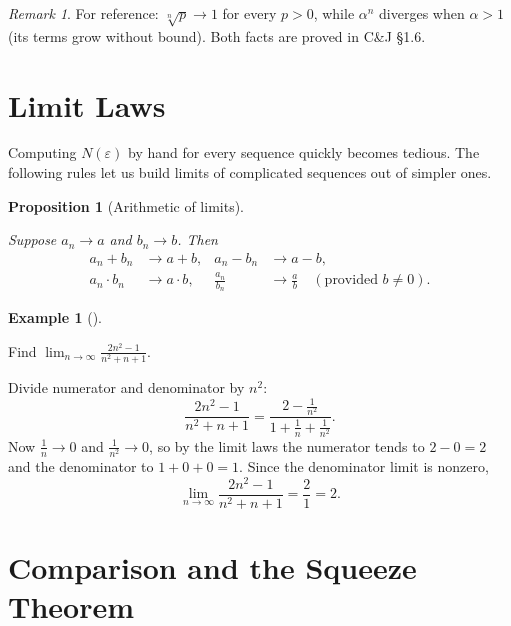 \documentclass[
  letterpaper,
  DIV=11,
  numbers=noendperiod]{scrreprt}
\theoremstyle{plain}
\theoremstyle{plain}
\newtheorem{proposition}{Proposition}[chapter]
\theoremstyle{definition}
\theoremstyle{definition}
\theoremstyle{definition}
\newtheorem{example}{Example}[chapter]
\theoremstyle{plain}
\theoremstyle{plain}
\theoremstyle{remark}
\newtheorem{refremark}{Remark}[chapter]
\begin{document}
\begin{refremark}
For reference: \(\sqrt[n]{p} \to 1\) for every \(p>0\), while
\(\alpha^n\) diverges when \(\alpha>1\) (its terms grow without bound).
Both facts are proved in C\&J §1.6.

\label{rem-sequences-limits-answers}

\end{refremark}

\section{Limit Laws}\label{limit-laws}

Computing \(N(\varepsilon)\) by hand for every sequence quickly becomes
tedious. The following rules let us build limits of complicated
sequences out of simpler ones.

\begin{proposition}[Arithmetic of
limits]\protect\hypertarget{prp-limit-laws}{}\label{prp-limit-laws}

Suppose \(a_n \to a\) and \(b_n \to b\). Then \[
\begin{aligned}
a_n + b_n &\to a + b, & a_n - b_n &\to a - b, \\
a_n \cdot b_n &\to a \cdot b, & \frac{a_n}{b_n} &\to \frac{a}{b} \quad (\text{provided } b \neq 0).
\end{aligned}
\]

\end{proposition}

\begin{example}[]\protect\hypertarget{exm-rational-sequence}{}\label{exm-rational-sequence}

\hfill\break
Find \(\displaystyle\lim_{n\to\infty} \frac{2n^2 - 1}{n^2 + n + 1}\).

Divide numerator and denominator by \(n^2\): \[
\frac{2n^2 - 1}{n^2 + n + 1}
= \frac{2 - \tfrac{1}{n^2}}{1 + \tfrac1n + \tfrac{1}{n^2}}.
\] Now \(\tfrac1n \to 0\) and \(\tfrac{1}{n^2} \to 0\), so by the limit
laws the numerator tends to \(2 - 0 = 2\) and the denominator to
\(1 + 0 + 0 = 1\). Since the denominator limit is nonzero, \[
\lim_{n\to\infty} \frac{2n^2 - 1}{n^2 + n + 1} = \frac{2}{1} = 2.
\]

\end{example}

\section{Comparison and the Squeeze
Theorem}\label{comparison-and-the-squeeze-theorem}
\end{document}
